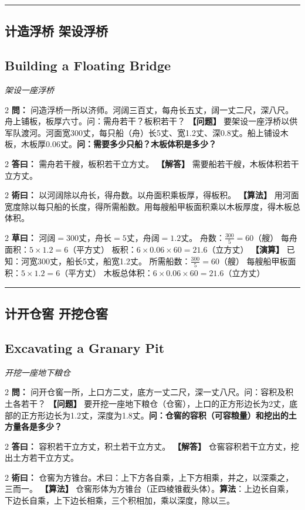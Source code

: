 \documentclass[11pt,a4paper]{article}
\newcommand{\longline}{\noindent\rule{\textwidth}{0.4pt}}
\newcommand{\bilingualProblem}[2]{%
  \vspace{0.6em}%
  \begin{paracol}{2}%
  \noindent\textcolor{problemcolor}{\textbf{問：}}#1%
  \switchcolumn%
  \noindent\textcolor{problemcolor}{\textbf{【问题】}}#2%
  \end{paracol}%
  \vspace{0.3em}%
}
\newcommand{\bilingualAnswer}[2]{%
  \begin{paracol}{2}%
  \noindent\textcolor{answercolor}{\textbf{答曰：}}#1%
  \switchcolumn%
  \noindent\textcolor{answercolor}{\textbf{【解答】}}#2%
  \end{paracol}%
  \vspace{0.3em}%
}
\newcommand{\bilingualMethod}[2]{%
  \begin{paracol}{2}%
  \noindent\textcolor{methodcolor}{\textbf{術曰：}}#1%
  \switchcolumn%
  \noindent\textcolor{methodcolor}{\textbf{【算法】}}#2%
  \end{paracol}%
  \vspace{0.3em}%
}
\newcommand{\bilingualWorking}[2]{%
  \begin{paracol}{2}%
  \noindent\textcolor{workingcolor}{\textbf{草曰：}}#1%
  \switchcolumn%
  \noindent\textcolor{workingcolor}{\textbf{【演算】}}#2%
  \end{paracol}%
  \vspace{0.3em}%
}
\newcommand{\bilingualSubsection}[2]{%
  \subsection{#1}
  \begin{center}
  {\small\color{sectioncolor}\textit{#2}}
  \end{center}
  \vspace{0.3em}
}
\begin{document}
\vspace{0.5em}
\longline

\subsection{计造浮桥 \quad 架设浮桥}
\bilingualSubsection{Building a Floating Bridge}{架设一座浮桥}

\bilingualProblem{%
问造浮桥一所以济师。河阔三百丈，每舟长五丈，阔一丈二尺，深八尺。舟上铺板，板厚六寸。问：需舟若干？板积若干？%
}{%
要架设一座浮桥以供军队渡河。河面宽300丈，每只船（舟）长5丈、宽1.2丈、深0.8丈。船上铺设木板，木板厚0.06丈。\textbf{问：需要多少只船？木板体积是多少？}%
}

\bilingualAnswer{%
需舟若干艘，板积若干立方丈。%
}{%
需要船若干艘，木板体积若干立方丈。%
}

\bilingualMethod{%
以河阔除以舟长，得舟数。以舟面积乘板厚，得板积。%
}{%
用河面宽度除以每只船的长度，得所需船数。用每艘船甲板面积乘以木板厚度，得木板总体积。%
}

\bilingualWorking{%
河阔$=300$丈，舟长$=5$丈，舟阔$=1.2$丈。
舟数：$\displaystyle\frac{300}{5} = 60$（艘）
每舟面积：$5 \times 1.2 = 6$（平方丈）
板积：$6 \times 0.06 \times 60 = 21.6$（立方丈）%
}{%
已知：河宽300丈，船长5丈，船宽1.2丈。
所需船数：$\displaystyle\frac{300}{5} = 60$（艘）
每艘船甲板面积：$5 \times 1.2 = 6$（平方丈）
木板总体积：$6 \times 0.06 \times 60 = 21.6$（立方丈）%
}

\vspace{0.5em}
\longline

\subsection{计开仓窖 \quad 开挖仓窖}
\bilingualSubsection{Excavating a Granary Pit}{开挖一座地下粮仓}

\bilingualProblem{%
问开仓窖一所，上口方二丈，底方一丈二尺，深一丈八尺。问：容积及积土各若干？%
}{%
要开挖一座地下粮仓（仓窖），上口的正方形边长为2丈，底部的正方形边长为1.2丈，深度为1.8丈。\textbf{问：仓窖的容积（可容粮量）和挖出的土方量各是多少？}%
}

\bilingualAnswer{%
容积若干立方丈，积土若干立方丈。%
}{%
仓窖容积若干立方丈，挖出土方若干立方丈。%
}

\bilingualMethod{%
仓窖为方锥台。术曰：上下方各自乘，上下方相乘，并之，以深乘之，三而一。%
}{%
仓窖形体为方锥台（正四棱锥截头体）。\textbf{算法}：上边长自乘，下边长自乘，上下边长相乘，三个积相加，乘以深度，除以三。%
}
\end{document}
